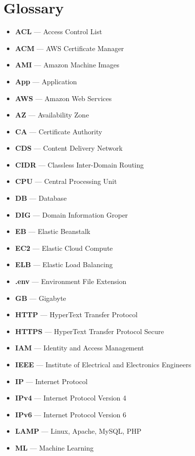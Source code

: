 \beforeabstract
\afterabstract
\chapter{Glossary}\label{ch:glossary}

\begin{itemize}
    \item  \textbf{ACL} — Access Control List
    \item  \textbf{ACM} — AWS Certificate Manager
    \item  \textbf{AMI} — Amazon Machine Images
    \item  \textbf{App} — Application
    \item  \textbf{AWS} — Amazon Web Services
    \item  \textbf{AZ} — Availability Zone
    \item  \textbf{CA} — Certificate Authority
    \item  \textbf{CDS} — Content Delivery Network
    \item  \textbf{CIDR} — Classless Inter-Domain Routing
    \item  \textbf{CPU} — Central Processing Unit
    \item  \textbf{DB} — Database
    \item  \textbf{DIG} — Domain Information Groper
    \item  \textbf{EB} — Elastic Beanstalk
    \item  \textbf{EC2} — Elastic Cloud Compute
    \item  \textbf{ELB} — Elastic Load Balancing
    \item  \textbf{.env} — Environment File Extension
    \item  \textbf{GB} — Gigabyte
    \item  \textbf{HTTP} — HyperText Transfer Protocol
    \item  \textbf{HTTPS} — HyperText Transfer Protocol Secure
    \item  \textbf{IAM} — Identity and Access Management
    \item  \textbf{IEEE} — Institute of Electrical and Electronics Engineers
    \item  \textbf{IP} — Internet Protocol
    \item  \textbf{IPv4} — Internet Protocol Version 4
    \item  \textbf{IPv6} — Internet Protocol Version 6
    \item  \textbf{LAMP} — Linux, Apache, MySQL, PHP
    \item  \textbf{ML} — Machine Learning

\end{itemize}
